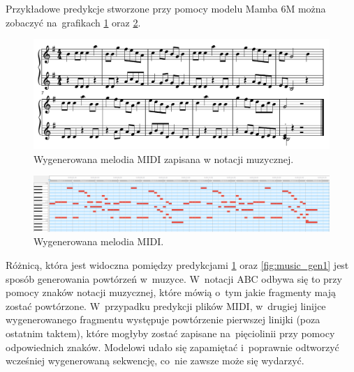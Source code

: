 \documentclass[data-science]{agh-wi} %
\begin{document}
Przykładowe predykcje stworzone przy pomocy modelu Mamba 6M można zobaczyć na~grafikach \ref*{fig:music_genMIDI_notes} oraz \ref*{fig:music_genMIDI}.

\begin{figure}[ht!]
    \begin{center}
        \includegraphics[width=0.9\linewidth]{./img/35.pdf}
    \end{center}
    \caption{Wygenerowana melodia MIDI zapisana w notacji muzycznej.}\label{fig:music_genMIDI_notes}
\end{figure}

\begin{figure}[ht!]
    \begin{center}
        \includegraphics[width=0.9\linewidth]{./img/midi_generated.png}
    \end{center}
    \caption{Wygenerowana melodia MIDI.}\label{fig:music_genMIDI}
\end{figure}

Różnicą, która jest widoczna pomiędzy predykcjami \ref*{fig:music_genMIDI_notes} oraz \ref*{fig:music_gen1} jest sposób generowania powtórzeń w~muzyce. W~notacji ABC odbywa się to przy pomocy znaków notacji muzycznej, które mówią o~tym jakie fragmenty mają zostać powtórzone. W~przypadku predykcji plików MIDI, w~drugiej linijce wygenerowanego fragmentu występuje powtórzenie pierwszej linijki (poza ostatnim taktem), które mogłyby zostać zapisane na~pięciolinii przy pomocy odpowiednich znaków. Modelowi udało się zapamiętać i~poprawnie odtworzyć wcześniej wygenerowaną sekwencję, co~nie zawsze może się wydarzyć.
\end{document}
